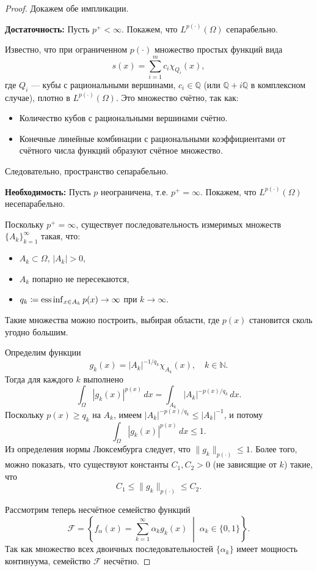 \documentclass[../NDCNNAI_main.tex]{subfiles}
\begin{document}
\begin{proof}
Докажем обе импликации.

\noindent
\textbf{Достаточность: } Пусть \( p^+ < \infty \). Покажем, что \( L^{p(\cdot)}(\Omega) \) сепарабельно.

Известно, что при ограниченном \( p(\cdot) \) множество простых функций вида
\[
s(x) = \sum_{i=1}^{m} c_i \chi_{Q_i}(x),
\]
где \( Q_i \) --- кубы с рациональными вершинами, \( c_i \in \mathbb{Q} \) (или \( \mathbb{Q} + i\mathbb{Q} \) в комплексном случае), плотно в \( L^{p(\cdot)}(\Omega) \). Это множество счётно, так как:
\begin{itemize}
    \item Количество кубов с рациональными вершинами счётно.
    \item Конечные линейные комбинации с рациональными коэффициентами от счётного числа функций образуют счётное множество.
\end{itemize}
Следовательно, пространство сепарабельно.

\noindent
\textbf{Необходимость: } Пусть \( p \) неограничена, т.е. \( p^+ = \infty \). Покажем, что \( L^{p(\cdot)}(\Omega) \) несепарабельно.

Поскольку \( p^+ = \infty \), существует последовательность измеримых множеств \( \{A_k\}_{k=1}^\infty \) такая, что:
\begin{itemize}
    \item \( A_k \subset \Omega \), \( |A_k| > 0 \),
    \item \( A_k \) попарно не пересекаются,
    \item \( q_k \coloneq \operatorname*{ess\,inf}_{x \in A_k} p(x) \to \infty \) при \( k \to \infty \).
\end{itemize}
Такие множества можно построить, выбирая области, где \( p(x) \) становится сколь угодно большим.

Определим функции
\[
g_k(x) = |A_k|^{-1/q_k} \chi_{A_k}(x), \quad k \in \mathbb{N}.
\]
Тогда для каждого \( k \) выполнено
\[
\int_\Omega |g_k(x)|^{p(x)} \, dx = \int_{A_k} |A_k|^{-p(x)/q_k} \, dx.
\]
Поскольку \( p(x) \geq q_k \) на \( A_k \), имеем \( |A_k|^{-p(x)/q_k} \leq |A_k|^{-1} \), и потому
\[
\int_\Omega |g_k(x)|^{p(x)} \, dx \leq 1.
\]
Из определения нормы Люксембурга следует, что \( \|g_k\|_{p(\cdot)} \leq 1 \). Более того, можно показать, что существуют константы \( C_1, C_2 > 0 \) (не зависящие от \( k \)) такие, что
\[
C_1 \leq \|g_k\|_{p(\cdot)} \leq C_2.
\]

Рассмотрим теперь несчётное семейство функций
\[
\mathcal{F} = \left\{ f_\alpha(x) = \sum_{k=1}^\infty \alpha_k g_k(x) \; \middle| \; \alpha_k \in \{0, 1\} \right\}.
\]
Так как множество всех двоичных последовательностей \( \{\alpha_k\} \) имеет мощность континуума, семейство \( \mathcal{F} \) несчётно.


\end{proof}
\end{document}

